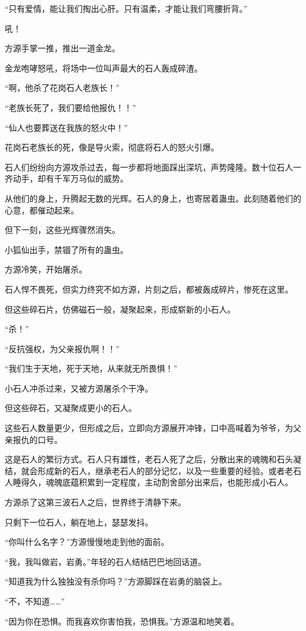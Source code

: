 \begin{this_body}
“只有爱情，能让我们掏出心肝。只有温柔，才能让我们弯腰折背。”

吼！

方源手掌一推，推出一道金龙。

金龙咆哮怒吼，将场中一位叫声最大的石人轰成碎渣。

“啊，他杀了花岗石人老族长！”

“老族长死了，我们要给他报仇！！”

“仙人也要葬送在我族的怒火中！”

花岗石老族长的死，像是导火索，彻底将石人的怒火引爆。

石人们纷纷向方源攻杀过去，每一步都将地面踩出深坑，声势隆隆。数十位石人一齐动手，却有千军万马似的威势。

从他们的身上，升腾起无数的光辉。石人的身上，也寄居着蛊虫。此刻随着他们的心意，都催动起来。

但下一刻，这些光辉骤然消失。

小狐仙出手，禁锢了所有的蛊虫。

方源冷笑，开始屠杀。

石人悍不畏死，但实力终究不如方源，片刻之后，都被轰成碎片，惨死在这里。

但这些碎石片，仿佛磁石一般，凝聚起来，形成崭新的小石人。

“杀！”

“反抗强权，为父亲报仇啊！！”

“我们生于天地，死于天地，从来就无所畏惧！”

小石人冲杀过来，又被方源屠杀个干净。

但这些碎石，又凝聚成更小的石人。

这些石人数量更少，但形成之后，立即向方源展开冲锋，口中高喊着为爷爷，为父亲报仇的口号。

这是石人的繁衍方式。石人只有雄性，老石人死了之后，分散出来的魂魄和石头凝结，就会形成新的石人，继承老石人的部分记忆，以及一些重要的经验。或者老石人睡得久，魂魄底蕴积累到一定程度，主动割舍部分出来后，也能形成小石人。

方源杀了这第三波石人之后，世界终于清静下来。

只剩下一位石人，躺在地上，瑟瑟发抖。

“你叫什么名字？”方源慢慢地走到他的面前。

“我，我叫做岩，岩勇。”年轻的石人结结巴巴地回话道。

“知道我为什么独独没有杀你吗？”方源脚踩在岩勇的脑袋上。

“不，不知道……”

“因为你在恐惧。而我喜欢你害怕我，恐惧我。”方源温和地笑着。

\end{this_body}

